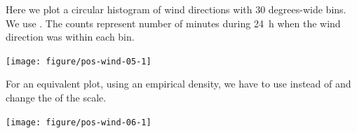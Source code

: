 \documentclass[krantz2]{krantz}\usepackage{knitr}%
\begin{document}
Here we plot a circular histogram of wind directions with 30 degrees-wide bins. We use . The counts represent number of minutes during 24~h when the wind direction was within each bin.

\begin{knitrout}\footnotesize
{}\color{fgcolor}\begin{kframe}
\begin{alltt}
   \hlopt{+}
  \hlstd{()} \hlopt{+}
  \hlstd{(} \hlstd{=} \hlstd{,}  \hlstd{=} \hlstd{,}  \hlstd{=} \hlstd{,}
            \hlstd{=} \hlstd{,}  \hlstd{=} \hlstd{)} \hlopt{+}
  \hlstd{(} \hlstd{=} \hlstd{)} \hlopt{+}
  \hlstd{(} \hlstd{=} \hlstd{(}\hlstd{,} \hlstd{,} \hlstd{,} \hlstd{),}
                      \hlstd{=} \hlstd{(}\hlstd{,} \hlstd{,} \hlstd{,} \hlstd{),}
                      \hlstd{=} \hlstd{(}\hlstd{,} \hlstd{),}
                      \hlstd{=} \hlstd{(}\hlstd{,} \hlstd{),}
                      \hlstd{=} \hlstd{)}
\end{alltt}
\end{kframe}

{\centering \texttt{[image: figure/pos-wind-05-1]} 

}



\end{knitrout}

For an equivalent plot, using an empirical density, we have to use  instead of  and change the  of the  scale.

\begin{knitrout}\footnotesize
{}\color{fgcolor}

{\centering \texttt{[image: figure/pos-wind-06-1]} 

}



\end{knitrout}
\end{document}
